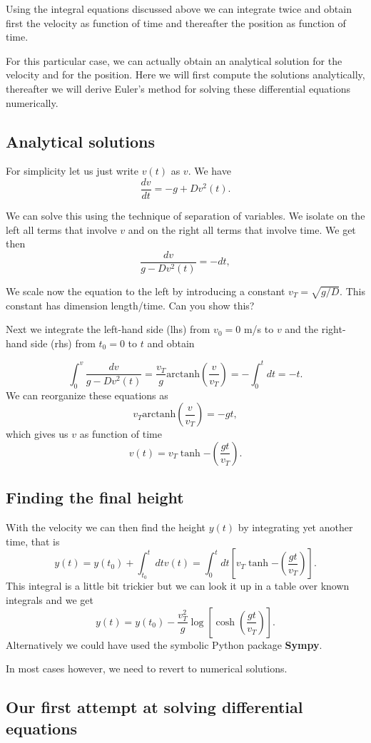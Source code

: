 \documentclass[%
oneside,                 %
final,                   %
10pt]{article}
\begin{document}
Using the integral equations discussed above we can integrate twice
and obtain first the velocity as function of time and thereafter the
position as function of time.

For this particular case, we can actually obtain an analytical
solution for the velocity and for the position. Here we will first
compute the solutions analytically, thereafter we will derive Euler's
method for solving these differential equations numerically.

\subsection{Analytical solutions}

For simplicity let us just write $v(t)$ as $v$. We have
\[
\frac{dv}{dt}= -g +Dv^2(t). 
\]

We can solve this using the technique of separation of variables. We
isolate on the left all terms that involve $v$ and on the right all
terms that involve time. We get then
\[
\frac{dv}{g -Dv^2(t) }= -dt,
\]

We scale now the equation to the left by introducing a constant
$v_T=\sqrt{g/D}$. This constant has dimension length/time. Can you
show this?

Next we integrate the left-hand side (lhs) from $v_0=0$ m/s to $v$ and
the right-hand side (rhs) from $t_0=0$ to $t$ and obtain

\[
\int_{0}^v\frac{dv}{g -Dv^2(t) }= \frac{v_T}{g}\mathrm{arctanh}(\frac{v}{v_T})  =-\int_0^tdt = -t. 
\]
We can reorganize these equations as
\[
v_T\mathrm{arctanh}(\frac{v}{v_T})  =-gt,
\]
which gives us $v$ as function of time
\[
v(t)=v_T\tanh{-(\frac{gt}{v_T})}.
\]

\subsection{Finding the final height}
With the velocity we can then find the height $y(t)$ by integrating yet another time, that is
\[
y(t)=y(t_0)+\int_{t_0}^t dt v(t)=\int_{0}^t dt[v_T\tanh{-(\frac{gt}{v_T})}]. 
\]
This integral is a little bit trickier but we can look it up in a table over 
known integrals and we get
\[
y(t)=y(t_0)-\frac{v_T^2}{g}\log{[\cosh{(\frac{gt}{v_T})}]}.
\]
Alternatively we could have used the symbolic Python package \textbf{Sympy}.

In most cases however, we need to revert to numerical solutions. 

\subsection{Our first attempt at solving differential equations}
\end{document}
